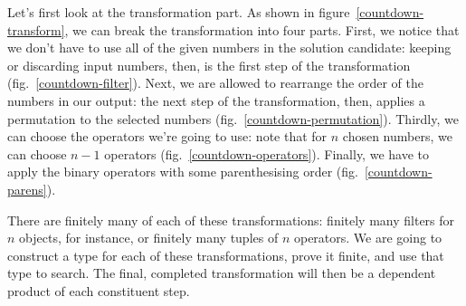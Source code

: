 

Let's first look at the transformation part.
As shown in figure~\ref{countdown-transform}, we can break the transformation
into four parts.
First, we notice that we don't have to use all of the given numbers in the
solution candidate: keeping or discarding input numbers, then, is the first step
of the transformation (fig.~\ref{countdown-filter}).
Next, we are allowed to rearrange the order of the numbers in our output: the
next step of the transformation, then, applies a permutation to the selected
numbers (fig.~\ref{countdown-permutation}).
Thirdly, we can choose the operators we're going to use: note that for \(n\)
chosen numbers, we can choose \(n - 1\) operators
(fig.~\ref{countdown-operators}).
Finally, we have to apply the binary operators with some parenthesising order
(fig.~\ref{countdown-parens}).

There are finitely many of each of these transformations: finitely many filters
for \(n\) objects, for instance, or finitely many tuples of \(n\) operators.
We are going to construct a type for each of these transformations, prove it
finite, and use that type to search.
The final, completed transformation will then be a dependent product of each
constituent step.




